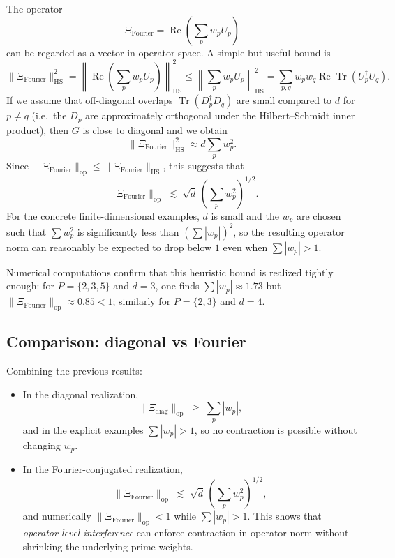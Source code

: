 \documentclass[11pt]{article}
\begin{document}
The operator
\[
  \Xi_{\mathrm{Fourier}} = \operatorname{Re}\left(\sum_p w_p U_p\right)
\]
can be regarded as a vector in operator space. A simple but useful bound is
\[
  \|\Xi_{\mathrm{Fourier}}\|_{\mathrm{HS}}^2
  = \left\|\operatorname{Re}\left(\sum_p w_p U_p\right)\right\|_{\mathrm{HS}}^2
  \le \left\|\sum_p w_p U_p\right\|_{\mathrm{HS}}^2
  = \sum_{p,q} w_p w_q \operatorname{Re}\operatorname{Tr}(U_p^\dagger U_q).
\]
If we assume that off-diagonal overlaps $\operatorname{Tr}(D_p^\dagger D_q)$ are small compared to $d$ for $p\neq q$ (i.e.\ the $D_p$ are approximately orthogonal under the Hilbert--Schmidt inner product), then $G$ is close to diagonal and we obtain
\[
  \|\Xi_{\mathrm{Fourier}}\|_{\mathrm{HS}}^2 \approx d\sum_p w_p^2.
\]
Since $\|\Xi_{\mathrm{Fourier}}\|_{\mathrm{op}}\le\|\Xi_{\mathrm{Fourier}}\|_{\mathrm{HS}}$, this suggests that
\[
  \|\Xi_{\mathrm{Fourier}}\|_{\mathrm{op}} \;\lesssim\; \sqrt{d}\,\left(\sum_p w_p^2\right)^{1/2}.
\]
For the concrete finite-dimensional examples, $d$ is small and the $w_p$ are chosen such that $\sum w_p^2$ is significantly less than $(\sum |w_p|)^2$, so the resulting operator norm can reasonably be expected to drop below $1$ even when $\sum |w_p|>1$.

Numerical computations confirm that this heuristic bound is realized tightly enough: for $P=\{2,3,5\}$ and $d=3$, one finds $\sum |w_p|\approx 1.73$ but $\|\Xi_{\mathrm{Fourier}}\|_{\mathrm{op}}\approx 0.85<1$; similarly for $P=\{2,3\}$ and $d=4$.

\subsection{Comparison: diagonal vs Fourier}

Combining the previous results:
\begin{itemize}
  \item In the diagonal realization,
  \[
    \|\Xi_{\mathrm{diag}}\|_{\mathrm{op}} \;\geq\; \sum_p |w_p|,
  \]
  and in the explicit examples $\sum |w_p|>1$, so no contraction is possible without changing $w_p$.

  \item In the Fourier-conjugated realization,
  \[
    \|\Xi_{\mathrm{Fourier}}\|_{\mathrm{op}} \;\lesssim\; \sqrt{d}\,\left(\sum_p w_p^2\right)^{1/2},
  \]
  and numerically $\|\Xi_{\mathrm{Fourier}}\|_{\mathrm{op}}<1$ while $\sum|w_p|>1$. This shows that \emph{operator-level interference} can enforce contraction in operator norm without shrinking the underlying prime weights.
\end{itemize}
\end{document}

